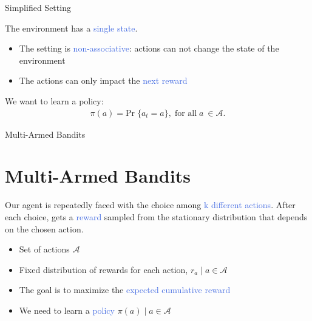 \documentclass{beamer}
\begin{document}
\begin{frame}{Simplified Setting}

The environment has a \textcolor{RoyalBlue}{single state}.

\vspace{2mm}

\begin{itemize}
    \item The setting is \textcolor{RoyalBlue}{non-associative}: actions can not change the state of the environment
    \item The actions can only impact the \textcolor{RoyalBlue}{next reward}
\end{itemize}

\vspace{2mm}

We want to learn a policy:
\begin{align*}
    \pi(a) = \text{Pr}\; \{a_t = a\}, \; \text{for all}\;  a\ \in \mathcal{A}. 
\end{align*}

\end{frame}


\begin{frame}{Multi-Armed Bandits}
\section{Multi-Armed Bandits}

Our agent is repeatedly faced with the choice among \textcolor{RoyalBlue}{k different actions}. After each choice, gets a \textcolor{RoyalBlue}{reward} sampled from the stationary distribution that depends on the chosen action.

\vspace{3mm}

\begin{itemize}
    \item Set of actions $\mathcal{A}$
    \item Fixed distribution of rewards for each action, $r_a \; |\; a \in \mathcal{A}$
    \item The goal is to maximize the \textcolor{RoyalBlue}{expected cumulative reward}
    \item We need to learn a \textcolor{RoyalBlue}{policy} $\pi(a)\; |\;  a \in \mathcal{A}$
\end{itemize}

\end{frame}
\end{document}
